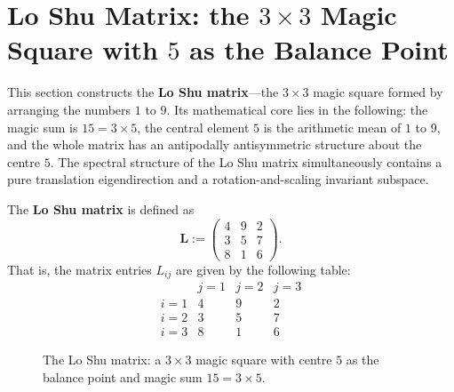\section{\texorpdfstring{Lo Shu Matrix: the $3\times 3$ Magic Square with $5$ as the Balance Point}{Lo Shu Matrix}}
\label{sec:luoshu_matrix}

This section constructs the \textbf{Lo Shu matrix}---the $3 \times 3$ magic square formed by arranging the numbers $1$ to $9$. Its mathematical core lies in the following: the magic sum is $15 = 3 \times 5$, the central element $5$ is the arithmetic mean of $1$ to $9$, and the whole matrix has an antipodally antisymmetric structure about the centre $5$. The spectral structure of the Lo Shu matrix simultaneously contains a pure translation eigendirection and a rotation-and-scaling invariant subspace.

\begin{definition}\label{def:luoshu_matrix}
The \textbf{Lo Shu matrix} is defined as
\[
\mathbf{L} := \begin{pmatrix}
4 & 9 & 2 \\
3 & 5 & 7 \\
8 & 1 & 6
\end{pmatrix}.
\]
That is, the matrix entries $L_{ij}$ are given by the following table:
\[
\begin{array}{c|ccc}
 & j=1 & j=2 & j=3 \\ \hline
i=1 & 4 & 9 & 2 \\
i=2 & 3 & 5 & 7 \\
i=3 & 8 & 1 & 6
\end{array}
\]
\end{definition}

\begin{figure}[htbp]
\centering
{}
\caption{The Lo Shu matrix: a $3\times 3$ magic square with centre $5$ as the balance point and magic sum $15=3\times 5$.}
\label{fig:luoshu_matrix}
\end{figure}

